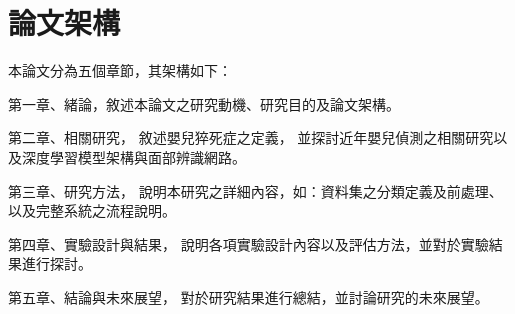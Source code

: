 \documentclass[class=NCU_thesis, crop=false]{standalone}
\begin{document}
\newpage
\section{論文架構}
本論文分為五個章節，其架構如下：

第一章、緒論，敘述本論文之研究動機、研究目的及論文架構。

第二章、相關研究，
敘述嬰兒猝死症之定義，
並探討近年嬰兒偵測之相關研究以及深度學習模型架構與面部辨識網路。

第三章、研究方法，
說明本研究之詳細內容，如：資料集之分類定義及前處理、以及完整系統之流程說明。

第四章、實驗設計與結果，
說明各項實驗設計內容以及評估方法，並對於實驗結果進行探討。

第五章、結論與未來展望，
對於研究結果進行總結，並討論研究的未來展望。
\end{document}
